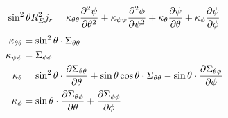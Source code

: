 \documentclass{article}
\begin{document}
\begin{equation*}
	\sin^2\theta R_E^2 j_r = \kappa_{\theta\theta}\pdv[2]{\psi}{\theta} +
	\kappa_{\psi\psi} \pdv[2]{\phi}{\psi} +
	\kappa_{\theta} \pdv{\psi}{\theta} +
	\kappa_{\phi} \pdv{\psi}{\phi}
\end{equation*}
\begin{equation*}
	\begin{aligned}
		\kappa_{\theta\theta} & = \sin^2 \theta \cdot  \Sigma_{\theta\theta}         \\
		\kappa_{\psi\psi}     & = \Sigma_{\phi\phi}                                  \\
		\kappa_{\theta}       & =
		\sin^2\theta\cdot \pdv{\Sigma_{\theta\theta}}{\theta}
		+ \sin \theta\cos\theta\cdot \Sigma_{\theta\theta}
		- \sin\theta\cdot\pdv{\Sigma_{\theta\phi}}{\phi}                             \\
		\kappa_{\phi}         & = \sin\theta\cdot\pdv{\Sigma_{\theta\phi}}{\theta} +
		\pdv{\Sigma_{\phi\phi}}{\phi}                                                \\
	\end{aligned}
\end{equation*}
\end{document}
